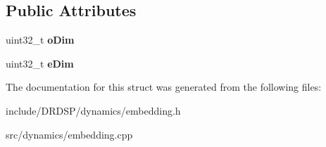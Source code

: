 \subsection*{Public Attributes}
\begin{DoxyCompactItemize}
\item 
\hypertarget{struct_d_r_d_s_p_1_1_embedding_ac49e8aa042fbf2ee8e9fdc3d2b4f1c26}{uint32\-\_\-t {\bfseries o\-Dim}}\label{struct_d_r_d_s_p_1_1_embedding_ac49e8aa042fbf2ee8e9fdc3d2b4f1c26}

\item 
\hypertarget{struct_d_r_d_s_p_1_1_embedding_aa49b8deb5d403025ca5db3f483c015b2}{uint32\-\_\-t {\bfseries e\-Dim}}\label{struct_d_r_d_s_p_1_1_embedding_aa49b8deb5d403025ca5db3f483c015b2}

\end{DoxyCompactItemize}


The documentation for this struct was generated from the following files\-:\begin{DoxyCompactItemize}
\item 
include/\-D\-R\-D\-S\-P/dynamics/embedding.\-h\item 
src/dynamics/embedding.\-cpp\end{DoxyCompactItemize}
